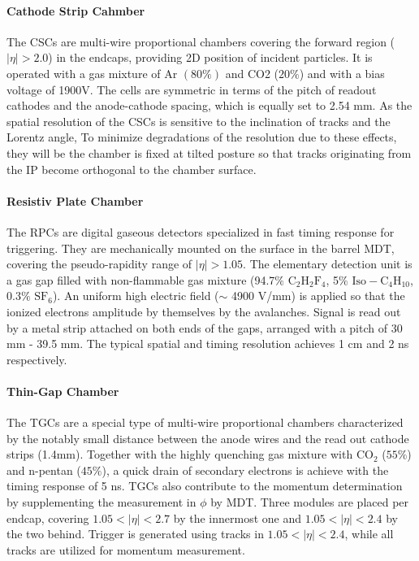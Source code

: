 \paragraph{Cathode Strip Cahmber}
The CSCs are multi-wire proportional chambers covering the forward region ($|\eta|>2.0$) in the endcaps, providing 2D position of incident particles.
It is operated with a gas mixture of Ar $(80\%)$ and CO2 ($20\%$) and with a bias voltage of 1900V.
The cells are symmetric in terms of the pitch of readout cathodes and the anode-cathode spacing, which is equally set to 2.54 mm.
As the spatial resolution of the CSCs is sensitive to the inclination of tracks and the Lorentz angle, To minimize degradations of the resolution due to these effects, they will be the chamber is fixed at tilted posture so that tracks originating from the IP become orthogonal to the chamber surface.


\paragraph{Resistiv Plate Chamber}
The RPCs are digital gaseous detectors specialized in fast timing response for triggering.
They are mechanically mounted on the surface in the barrel MDT, covering the pseudo-rapidity range of $|\eta|>1.05$.
The elementary detection unit is a gas gap filled with non-flammable gas mixture (94.7$\%$ $\mathrm{C_2 H_2 F_4}$, 5$\%$ $\mathrm{Iso-C_4 H_10}$, 0.3$\%$ $\mathrm{SF_6}$). An uniform high electric field ($\sim$ 4900 V/mm) is applied so that the ionized electrons amplitude by themselves by the avalanches. Signal is read out by a metal strip attached on both ends of the gaps, arranged with a pitch of 30 mm - 39.5 mm.
The typical spatial and timing resolution achieves 1 cm and 2 ns respectively.



\paragraph{Thin-Gap Chamber}
The TGCs are a special type of multi-wire proportional chambers characterized by the notably small distance between the anode wires and the read out cathode strips (1.4mm).
Together with the highly quenching gas mixture with $\mathrm{CO_{2}}$ ($55\%$) and n-pentan ($45\%$), a quick drain of secondary electrons is achieve with the timing response of 5 ns. TGCs also contribute to the momentum determination by supplementing the measurement in $\phi$ by MDT.
Three modules are placed per endcap, covering $1.05<|\eta|<2.7$ by the innermost one and $1.05<|\eta|<2.4$ by the two behind. Trigger is generated using tracks in $1.05<|\eta|<2.4$, while all tracks are utilized for momentum measurement.


